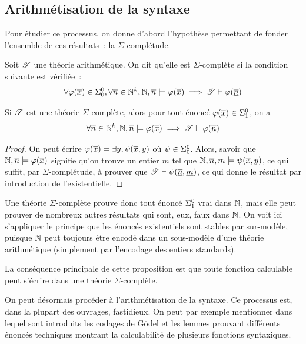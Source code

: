 \subsection{Arithmétisation de la syntaxe}

Pour étudier ce processus, on donne d'abord l'hypothèse permettant de fonder
l'ensemble de ces résultats~: la $\Sigma$-complétude.

\begin{definition}
  Soit $\mathscr T$ une théorie arithmétique. On dit qu'elle est
  $\Sigma$-complète si la condition suivante est vérifiée~:
  \[\forall \varphi(\overline{x}) \in \Sigma^0_{0}, \forall \overline{n} \in \mathbb N^k,
  \mathbb N,\overline{n}\models \varphi (\overline{x})\implies
  \mathscr T \vdash \varphi(\underline{\overline{n}})\]
\end{definition}

\begin{proposition}
  Si $\mathscr T$ est une théorie $\Sigma$-complète, alors pour tout énoncé
  $\varphi(\overline{x}) \in \Sigma^0_{1}$, on a
  \[\forall \overline{n} \in \mathbb N^k, \mathbb N,\overline{n} \models\varphi(\overline{x})\implies
  \mathscr T \vdash \varphi(\underline{\overline{n}})\]
\end{proposition}

\begin{proof}
  On peut écrire $\varphi(\overline{x}) = \exists y, \psi(\overline{x},y)$ où
  $\psi \in \Sigma^0_{0}$. Alors, savoir que
  $\mathbb N,\overline{n} \models \varphi(\overline{x})$ signifie qu'on trouve un entier $m$ tel
  que $\mathbb N, \overline{n},m\models \psi(\overline{x}, y)$, ce qui suffit, par
  $\Sigma$-complétude, à prouver que
  $\mathscr T\vdash \psi(\underline{\overline{n}},\underline{m})$, ce qui donne le résultat
  par introduction de l'existentielle.
\end{proof}

\begin{remark}
  Une théorie $\Sigma$-complète prouve donc tout énoncé $\Sigma^0_{1}$ vrai
  dans $\mathbb N$, mais elle peut prouver de nombreux autres résultats qui sont, eux,
  faux dans $\mathbb N$. On voit ici s'appliquer le principe que les énoncés
  existentiels sont stables par sur-modèle, puisque $\mathbb N$ peut toujours être
  encodé dans un sous-modèle d'une théorie arithmétique (simplement par
  l'encodage des entiers standards).
\end{remark}

La conséquence principale de cette proposition est que toute fonction
calculable peut s'écrire dans une théorie $\Sigma$-complète.

On peut désormais procéder à l'arithmétisation de la syntaxe. Ce processus est,
dans la plupart des ouvrages, fastidieux. On peut par exemple mentionner
\cite{Cori2020} dans lequel sont introduits les codages de Gödel et
les lemmes prouvant différents énoncés techniques montrant la calculabilité de
plusieurs fonctions syntaxiques.

